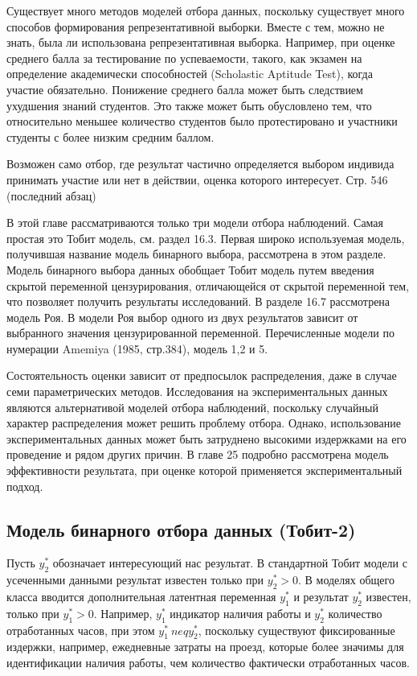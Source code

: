 Существует много методов моделей отбора данных, поскольку существует много способов формирования репрезентативной выборки. Вместе с тем, можно не знать, была ли использована репрезентативная выборка. Например, при оценке среднего балла за тестирование по успеваемости, такого, как экзамен на определение академически способностей (Scholastic Aptitude Test), когда участие обязательно. Понижение среднего балла может быть следствием ухудшения знаний студентов. Это также может быть обусловлено тем, что относительно меньшее количество студентов было протестировано и участники студенты с более низким средним баллом.

Возможен само отбор, где результат частично определяется выбором индивида принимать участие или нет в действии, оценка которого интересует. 
Стр. 546 (последний абзац)


В этой главе рассматриваются только три модели отбора наблюдений. Самая простая это Тобит модель, см. раздел 16.3. Первая широко используемая модель, получившая название модель бинарного выбора, рассмотрена в этом разделе. Модель бинарного выбора данных обобщает Тобит модель путем введения скрытой переменной цензурирования, отличающейся от скрытой переменной тем, что позволяет получить результаты исследований. В разделе 16.7 рассмотрена модель Роя. В модели Роя выбор одного из двух результатов зависит от выбранного значения цензурированной переменной. Перечисленные модели по нумерации Amemiya (1985, стр.384), модель 1,2 и 5.


Состоятельность оценки зависит от предпосылок распределения, даже в случае семи параметрических методов. Исследования на экспериментальных данных являются альтернативой моделей отбора наблюдений, поскольку случайный характер распределения может решить проблему отбора. Однако, использование экспериментальных данных может быть затруднено высокими издержками на его проведение и рядом других причин. В главе 25 подробно рассмотрена модель эффективности результата, при оценке которой применяется экспериментальный подход.


\subsection{Модель бинарного отбора данных (Тобит-2)}


Пусть $y^{*}_{2}$ обозначает интересующий нас результат. В стандартной Тобит модели с усеченными данными результат известен только при $y^{*}_{2}>0$. В моделях общего класса вводится дополнительная латентная переменная $y^{*}_1$ и результат $y^{*}_2$ известен, только при $y^{*}_{1}>0$. Например, $y^{*}_1$ индикатор наличия работы и $y^{*}_2$ количество отработанных часов, при этом $y^{*}_1{\ neq}y^{*}_2$, поскольку существуют фиксированные издержки, например, ежедневные затраты на проезд, которые более значимы для идентификации наличия работы, чем количество фактически отработанных часов.

